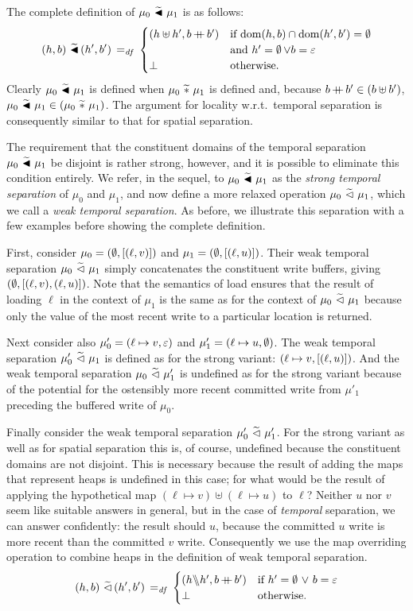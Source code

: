 \documentclass[11pt]{report}
\begin{document}
The complete definition of $\mu_0 \operatorname{\,\widetilde{\blacktriangleleft}\,} \mu_1$ is as follows: \[ (h,b) \operatorname{\,\widetilde{\blacktriangleleft}\,} (h',b') \operatorname{\;=_{\mathit{df}}\;} \begin{cases}
  (h \uplus h', b \operatorname{+\!\!\!+} b') & \text{if $\operatorname{\mathrm{dom}}(h,b) \cap \operatorname{\mathrm{dom}}(h',b') = \operatorname{\emptyset}$} \\ & \text{and $h' = \operatorname{\emptyset} \vee b = \varepsilon$} \\
  \bot & \text{otherwise.}
\end{cases}\] Clearly $\mu_0 \operatorname{\,\widetilde{\blacktriangleleft}\,} \mu_1$ is defined when $\mu_0 \operatorname{\,\widetilde{\ast}\,} \mu_1$ is defined and, because $b \operatorname{+\!\!\!+} b' \in (b \uplus b')$, $\mu_0 \operatorname{\,\widetilde{\blacktriangleleft}\,} \mu_1 \in (\mu_0 \operatorname{\,\widetilde{\ast}\,} \mu_1)$. The argument for locality w.r.t.\ temporal separation is consequently similar to that for spatial separation. 

The requirement that the constituent domains of the temporal separation $\mu_0 \operatorname{\,\widetilde{\blacktriangleleft}\,} \mu_1$ be disjoint is rather strong, however, and it is possible to eliminate this condition entirely. We refer, in the sequel, to  $\mu_0 \operatorname{\,\widetilde{\blacktriangleleft}\,} \mu_1$ as the \emph{strong temporal separation} of $\mu_0$ and $\mu_1$, and now define a more relaxed operation $\mu_0 \operatorname{\,\widetilde{\vartriangleleft}\,} \mu_1$, which we call a \emph{weak temporal separation}. As before, we illustrate this separation with a few examples before showing the complete definition. 

First, consider $\mu_0 = (\operatorname{\emptyset},\left[(\ell,v)\right])$ and $\mu_1 = (\operatorname{\emptyset},\left[(\ell,u)\right])$. Their weak temporal separation $\mu_0 \operatorname{\,\widetilde{\vartriangleleft}\,} \mu_1$ simply concatenates the constituent write buffers, giving $(\operatorname{\emptyset},\left[(\ell,v),(\ell,u)\right])$. Note that the semantics of load ensures that the result of loading $\ell$ in the context of $\mu_1$ is the same as for the context of $\mu_0 \operatorname{\,\widetilde{\vartriangleleft}\,} \mu_1$ because only the value of the most recent write to a particular location is returned. 

Next consider also $\mu'_0 = (\ell \mapsto v,\varepsilon)$ and $\mu'_1 = (\ell \mapsto u, \operatorname{\emptyset})$. The weak temporal separation $\mu'_0 \operatorname{\,\widetilde{\vartriangleleft}\,} \mu_1$ is defined as for the strong variant: $(\ell \mapsto v, \left[(\ell,u)\right])$. And the weak temporal separation $\mu_0 \operatorname{\,\widetilde{\vartriangleleft}\,} \mu'_1$ is undefined as for the strong variant because of the potential for the ostensibly more recent committed write from $\mu'_1$ preceding the buffered write of $\mu_0$. 

Finally consider the weak temporal separation $\mu'_0 \operatorname{\,\widetilde{\vartriangleleft}\,} \mu'_1$. For the strong variant as well as for spatial separation this is, of course, undefined because the constituent domains are not disjoint. This is necessary because the result of adding the maps that represent heaps is  undefined in this case; for what would be the result of applying the hypothetical map $(\ell \mapsto v) \uplus (\ell \mapsto u)$ to $\ell$? Neither $u$ nor $v$ seem like suitable answers in general, but in the case of \emph{temporal} separation, we can answer confidently: the result should $u$, because the committed $u$ write is more recent than the committed $v$ write. Consequently we use the map overriding operation to combine heaps in the definition of weak temporal separation. 
\[ (h,b) \operatorname{\,\widetilde{\vartriangleleft}\,} (h',b') \operatorname{\;=_{\mathit{df}}\;} \begin{cases}
(h \backslash\!\!\backslash h', b \operatorname{+\!\!\!+} b') & \text{if $h' = \operatorname{\emptyset} \operatorname{\,\vee\,} b = \varepsilon$} \\
\bot & \text{otherwise.}
\end{cases}\]
\end{document}
